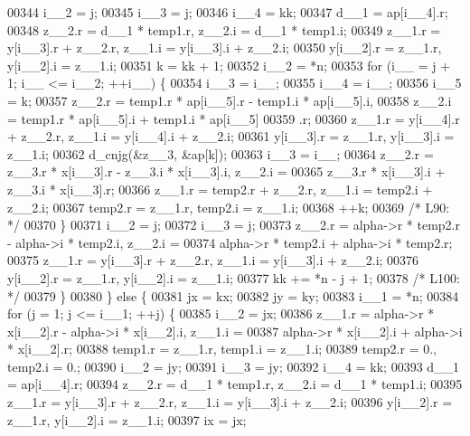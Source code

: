 \begin{DoxyCode}
00344         i\_\_2 = j;
00345         i\_\_3 = j;
00346         i\_\_4 = kk;
00347         d\_\_1 = ap[i\_\_4].r;
00348         z\_\_2.r = d\_\_1 * temp1.r, z\_\_2.i = d\_\_1 * temp1.i;
00349         z\_\_1.r = y[i\_\_3].r + z\_\_2.r, z\_\_1.i = y[i\_\_3].i + z\_\_2.i;
00350         y[i\_\_2].r = z\_\_1.r, y[i\_\_2].i = z\_\_1.i;
00351         k = kk + 1;
00352         i\_\_2 = *n;
00353         \textcolor{keywordflow}{for} (i\_\_ = j + 1; i\_\_ <= i\_\_2; ++i\_\_) \{
00354             i\_\_3 = i\_\_;
00355             i\_\_4 = i\_\_;
00356             i\_\_5 = k;
00357             z\_\_2.r = temp1.r * ap[i\_\_5].r - temp1.i * ap[i\_\_5].i, 
00358                 z\_\_2.i = temp1.r * ap[i\_\_5].i + temp1.i * ap[i\_\_5]
00359                 .r;
00360             z\_\_1.r = y[i\_\_4].r + z\_\_2.r, z\_\_1.i = y[i\_\_4].i + z\_\_2.i;
00361             y[i\_\_3].r = z\_\_1.r, y[i\_\_3].i = z\_\_1.i;
00362             d\_cnjg(&z\_\_3, &ap[k]);
00363             i\_\_3 = i\_\_;
00364             z\_\_2.r = z\_\_3.r * x[i\_\_3].r - z\_\_3.i * x[i\_\_3].i, z\_\_2.i =
00365                  z\_\_3.r * x[i\_\_3].i + z\_\_3.i * x[i\_\_3].r;
00366             z\_\_1.r = temp2.r + z\_\_2.r, z\_\_1.i = temp2.i + z\_\_2.i;
00367             temp2.r = z\_\_1.r, temp2.i = z\_\_1.i;
00368             ++k;
00369 \textcolor{comment}{/* L90: */}
00370         \}
00371         i\_\_2 = j;
00372         i\_\_3 = j;
00373         z\_\_2.r = alpha->r * temp2.r - alpha->i * temp2.i, z\_\_2.i = 
00374             alpha->r * temp2.i + alpha->i * temp2.r;
00375         z\_\_1.r = y[i\_\_3].r + z\_\_2.r, z\_\_1.i = y[i\_\_3].i + z\_\_2.i;
00376         y[i\_\_2].r = z\_\_1.r, y[i\_\_2].i = z\_\_1.i;
00377         kk += *n - j + 1;
00378 \textcolor{comment}{/* L100: */}
00379         \}
00380     \} \textcolor{keywordflow}{else} \{
00381         jx = kx;
00382         jy = ky;
00383         i\_\_1 = *n;
00384         \textcolor{keywordflow}{for} (j = 1; j <= i\_\_1; ++j) \{
00385         i\_\_2 = jx;
00386         z\_\_1.r = alpha->r * x[i\_\_2].r - alpha->i * x[i\_\_2].i, z\_\_1.i =
00387              alpha->r * x[i\_\_2].i + alpha->i * x[i\_\_2].r;
00388         temp1.r = z\_\_1.r, temp1.i = z\_\_1.i;
00389         temp2.r = 0., temp2.i = 0.;
00390         i\_\_2 = jy;
00391         i\_\_3 = jy;
00392         i\_\_4 = kk;
00393         d\_\_1 = ap[i\_\_4].r;
00394         z\_\_2.r = d\_\_1 * temp1.r, z\_\_2.i = d\_\_1 * temp1.i;
00395         z\_\_1.r = y[i\_\_3].r + z\_\_2.r, z\_\_1.i = y[i\_\_3].i + z\_\_2.i;
00396         y[i\_\_2].r = z\_\_1.r, y[i\_\_2].i = z\_\_1.i;
00397         ix = jx;

\end{DoxyCode}
